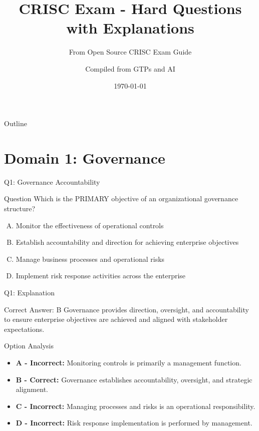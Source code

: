 \documentclass{beamer}
\title{CRISC Exam - Hard Questions with Explanations}
\subtitle{From Open Source CRISC Exam Guide}
\author{Compiled from GTPs and AI}
\date{\today}
\begin{document}
	
	\begin{frame}
		\titlepage
	\end{frame}
	
	\begin{frame}{Outline}
		\tableofcontents
	\end{frame}
	
	
	\section{Domain 1: Governance}
	
\begin{frame}{Q1: Governance Accountability}
	\begin{block}{Question}
		Which is the PRIMARY objective of an organizational governance structure?
	\end{block}
	
	\begin{enumerate}[(A)]
		\item Monitor the effectiveness of operational controls
		\item Establish accountability and direction for achieving enterprise objectives
		\item Manage business processes and operational risks
		\item Implement risk response activities across the enterprise
	\end{enumerate}
\end{frame}

\begin{frame}{Q1: Explanation}
	\begin{block}{Correct Answer: B}
		Governance provides direction, oversight, and accountability
		to ensure enterprise objectives are achieved and aligned with
		stakeholder expectations.
	\end{block}
	
	\begin{block}{Option Analysis}
		\begin{itemize}
			\item \textbf{A - Incorrect:} Monitoring controls is primarily a management function.
			\item \textbf{B - Correct:} Governance establishes accountability, oversight, and strategic alignment.
			\item \textbf{C - Incorrect:} Managing processes and risks is an operational responsibility.
			\item \textbf{D - Incorrect:} Risk response implementation is performed by management.
		\end{itemize}
	\end{block}
\end{frame}
\end{document}
